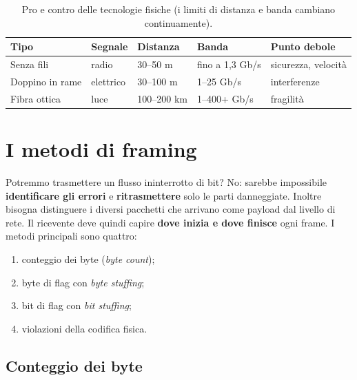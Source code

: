 \begin{table}[H]
\centering
\begin{tabular}{lllll}
\toprule
\textbf{Tipo} & \textbf{Segnale} & \textbf{Distanza} & \textbf{Banda} & \textbf{Punto debole} \\
\midrule
Senza fili & radio & 30--50 m & fino a 1,3 Gb/s & sicurezza, velocità \\
Doppino in rame & elettrico & 30--100 m & 1--25 Gb/s & interferenze \\
Fibra ottica & luce & 100--200 km & 1--400+ Gb/s & fragilità \\
\bottomrule
\end{tabular}
\caption{Pro e contro delle tecnologie fisiche (i limiti di distanza e banda cambiano continuamente).}
\end{table}

\section{I metodi di framing}

Potremmo trasmettere un flusso ininterrotto di bit? No: sarebbe impossibile \textbf{identificare gli errori} e
\textbf{ritrasmettere} solo le parti danneggiate. Inoltre bisogna distinguere i diversi pacchetti che arrivano come payload dal livello
di rete. Il ricevente deve quindi capire \textbf{dove inizia e dove finisce} ogni frame. I metodi principali sono quattro:

\begin{enumerate}
    \item conteggio dei byte (\emph{byte count});
    \item byte di flag con \emph{byte stuffing};
    \item bit di flag con \emph{bit stuffing};
    \item violazioni della codifica fisica.
\end{enumerate}

\subsection{Conteggio dei byte}


